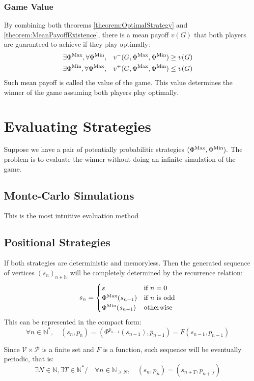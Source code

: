 \subsubsection{Game Value}
By combining both theorems \ref{theorem:OptimalStrategy} and \ref{theorem:MeanPayoffExistence}, there is a mean payoff $v(G)$ that both players are guaranteed to achieve if they play optimally:
\begin{align*}
\exists \Phi^{\operatorname{Max}},\forall \Phi^ {\operatorname{Min}}, & \quad v^-(G,\Phi^{\operatorname{Max}},\Phi^{\operatorname{Min}}) \ge v(G) \\
\exists \Phi^{\operatorname{Min}},\forall \Phi^{\operatorname{Max}}, & \quad v^+(G,\Phi^{\operatorname{Max}},\Phi^{\operatorname{Min}}) \le v(G) 
\end{align*}
Such mean payoff is called the value of the game. This value determines the winner of the game assuming both players play optimally.
\section{Evaluating Strategies}
\label{section:StrategyEvalution}
Suppose we have a pair of potentially probabilitic strategies $(\Phi^{\operatorname{Max}},\Phi^{\operatorname{Min}}).$ The problem is to evaluate the winner without doing an infinite simulation of the game. 
\subsection{Monte-Carlo Simulations}
This is the most intuitive evaluation method 
\subsection{Positional Strategies}
If both strategies are deterministic and memoryless. Then the generated sequence of vertices $(s_n)_{n\in\mathbb{N}}$ will be completely determined by the recurrence relation:
$$
s_n=\begin{cases}
	s & \text{if } \space n=0 \\
	\Phi^{\operatorname{Max}}(s_{n-1})& \text{if}\ n \ \text{is odd} \\
	\Phi^{\operatorname{Min}} (s_{n-1}) & \text{otherwise}
\end{cases}
$$
This can be represented in the compact form:
$$
\forall n\in\mathbb{N}^*,\quad \left(s_n, p_n
\right) = \left(\Phi^{p_{n-1}}(s_{n-1}), \bar{p}_{n-1}\right) = F(s_{n-1},p_{n-1})
$$

Since $\mathcal{V} \times \mathcal{P}$ is a finite set and $F$ is a function, such sequence will be eventually periodic, that is:
$$
\exists N \in \mathbb{N},\exists T\in\mathbb{N}^*/\quad \forall n\in\mathbb{N}_{\ge N},\quad (s_{n},p_{n})=(s_{n+T},p_{n+T})
$$

